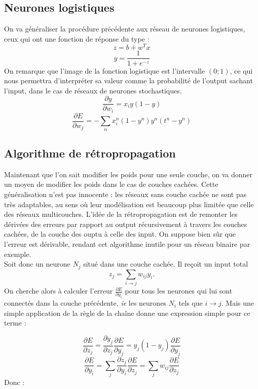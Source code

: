 \documentclass{article}
\theoremstyle{definition}
\begin{document}

\newpage

\subsection{Neurones logistiques}

On va généraliser la procédure précédente aux réseau de neurones logistiques, ceux qui ont une fonction de réponse du type : 
\[z=b+w^Tx\]
\[y=\frac{1}{1+e^{-z}}\]
On remarque que l'image de la fonction logistique est l'intervalle $(0;1)$, ce qui nous permettra d'interpréter sa valeur comme la probabilité de l'output sachant l'input, dans le cas de réseaux de neurones stochastiques. 
\[\frac{\partial y}{\partial w_i}=x_i y(1-y)\]
\[\frac{\partial E}{\partial w_j}=-\sum_{n}x_i^n(1-y^n)y^n(t^n-y^n)\]

\subsection{Algorithme de rétropropagation}

Maintenant que l'on sait modifier les poids pour une seule couche, on va donner un moyen de modifier les poids dans le cas de couches cachées. Cette généralisation n'est pas innocente : les réseaux sans couche cachée ne sont pas très adaptables, au sens où leur modélisation est beaucoup plus limitée que celle des réseaux multicouches. L'idée de la rétropropagation est de remonter les dérivées des erreurs par rapport au output récursivement à travers les couches cachées, de la couche des ouptu à celle des input. On suppose bien sûr que l'erreur est dérivable, rendant cet algorithme inutile pour un réseau binaire par exemple.\\

Soit donc un neurone $N_j$ situé dans une couche cachée. Il reçoit un input total 
\[z_j=\sum_{i\rightarrow j} w_{ij}y_i.\]
On cherche alors à calculer l'erreur $\frac{\partial E}{\partial y_i}$ pour tous les neurones qui lui sont connectés dans la couche précédente, \textit{ie} les neurones $N_i$ tels que $i\rightarrow j$. Mais une simple application de la règle de la chaîne donne une expression simple pour ce terme :

\[\frac{\partial E}{\partial z_j}=\frac{\partial y_j}{\partial z_j}\frac{\partial E}{\partial y_j}=y_j(1-y_j)\frac{\partial E}{\partial y_j}\]
\[\frac{\partial E}{\partial y_i}=\sum_j\frac{\partial z_j}{\partial y_i}\frac{\partial E}{\partial z_j}=\sum_j w_{ij}\frac{\partial E}{\partial z_j}\]
Donc :\\
\end{document}
